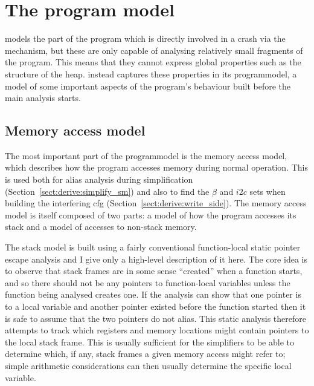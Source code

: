 {\section{The program model}
\label{sect:program_model}


{\Technique} models the part of the program which is directly involved
in a crash via the {\StateMachine} mechanism, but these are only
capable of analysing relatively small fragments of the program.  This
means that they cannot express global properties such as the structure
of the heap.  {\Technique} instead captures these properties in its
\gls{programmodel}, a model of some important aspects of the program's
behaviour built before the main analysis starts.


\subsection{Memory access model}
\label{sect:program_model:dynamic_alias}

The most important part of the \gls{programmodel} is the memory access
model, which describes how the program accesses memory during normal
operation.  This is used both for alias analysis during
{\StateMachine} simplification (Section~\ref{sect:derive:simplify_sm})
and also to find the $\beta$ and $i2c$ sets when building the
interfering \gls{cfg} (Section~\ref{sect:derive:write_side}).  The
memory access model is itself composed of two parts: a model of how
the program accesses its stack and a model of accesses to non-stack
memory.

The stack model is built using a fairly conventional function-local
static pointer escape analysis\needCite{} and I give only a high-level
description of it here.  The core idea is to observe that stack frames
are in some sense ``created'' when a function starts, and so there
should not be any pointers to function-local variables unless the
function being analysed creates one.  If the analysis can show that
one pointer is to a local variable and another pointer existed before
the function started then it is safe to assume that the two pointers
do not alias.  This static analysis therefore attempts to track which
registers and memory locations might contain pointers to the local
stack frame.  This is usually sufficient for the {\StateMachine}
simplifiers to be able to determine which, if any, stack frames a
given memory access might refer to; simple arithmetic considerations
can then usually determine the specific local variable.

}
